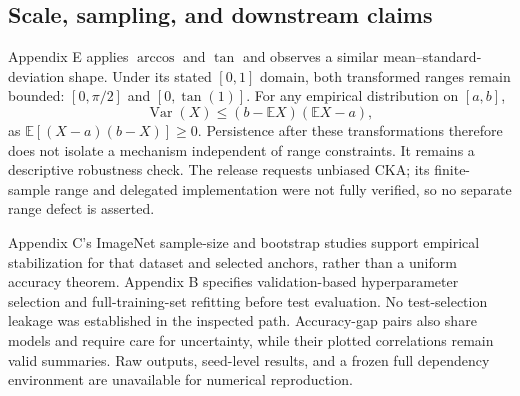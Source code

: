 \documentclass[10pt]{article}
\begin{document}
\subsection*{Scale, sampling, and downstream claims}
Appendix E applies \(\arccos\) and \(\tan\) and observes a similar mean–standard-deviation shape. Under its stated \([0,1]\) domain, both transformed ranges remain bounded: \([0,\pi/2]\) and \([0,\tan(1)]\). For any empirical distribution on \([a,b]\), \[\operatorname{Var}(X)\le (b-\mathbb EX)(\mathbb EX-a),\] as \(\mathbb E[(X-a)(b-X)]\ge0\). Persistence after these transformations therefore does not isolate a mechanism independent of range constraints. It remains a descriptive robustness check. The release requests unbiased CKA; its finite-sample range and delegated implementation were not fully verified, so no separate range defect is asserted.\par
Appendix C’s ImageNet sample-size and bootstrap studies support empirical stabilization for that dataset and selected anchors, rather than a uniform accuracy theorem. Appendix B specifies validation-based hyperparameter selection and full-training-set refitting before test evaluation. No test-selection leakage was established in the inspected path. Accuracy-gap pairs also share models and require care for uncertainty, while their plotted correlations remain valid summaries. Raw outputs, seed-level results, and a frozen full dependency environment are unavailable for numerical reproduction.\par
\end{document}
